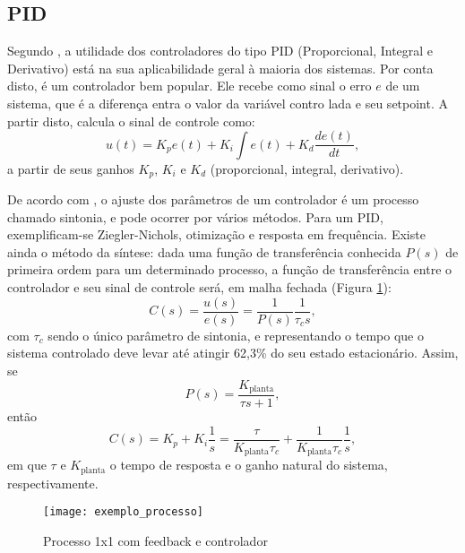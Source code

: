 \subsection{PID}

Segundo , a utilidade dos controladores do tipo PID (Proporcional, Integral e Derivativo) está na sua aplicabilidade geral à maioria dos sistemas. Por conta disto, é um controlador bem popular. Ele recebe como sinal o erro $e$ de um sistema, que é a diferença entra o valor da variável contro	lada e seu setpoint. A partir disto, calcula o sinal de controle como:
\begin{equation}
u(t) = K_p e(t) + K_i \int e(t) + K_d \frac{de(t)}{dt}
\label{eq_PID},	
\end{equation}
a partir de seus ganhos $K_p$, $K_i$ e $K_d$ (proporcional, integral, derivativo).

De acordo com , o ajuste dos parâmetros de um controlador é um processo chamado sintonia, e pode ocorrer por vários métodos. Para um PID, exemplificam-se Ziegler-Nichols, otimização e resposta em frequência. Existe ainda o método da síntese: dada uma função de transferência conhecida $P(s)$ de primeira ordem para um determinado processo, a função de transferência entre o controlador e seu sinal de controle será, em malha fechada (Figura \ref{img_exemplo_processo}):
\begin{equation}
C(s) = \frac{u(s)}{e(s)} = \frac{1}{P(s)} \frac{1}{\tau_c s},
\end{equation}
com $\tau_c$ sendo o único parâmetro de sintonia, e representando o tempo que o sistema controlado deve levar até atingir 62,3\% do seu estado estacionário. Assim, se 
\begin{equation}
P(s) = \frac{K_{\text{planta}}}{\tau s + 1},
\end{equation}
então
\begin{equation}
C(s) = K_p + K_i \frac{1}{s} = \frac{\tau}{K_{\text{planta}} \tau_c} + \frac{1}{K_{\text{planta}} \tau_c} \frac{1}{s},
\label{sintese_controlador}
\end{equation}
em que $\tau$ e $K_{\text{planta}}$ o tempo de resposta e o ganho natural do sistema, respectivamente.

\begin{figure}[hbt]
	\centering
	\caption{Processo 1x1 com feedback e controlador}
	\texttt{[image: exemplo\_processo]}
	\label{img_exemplo_processo}
\end{figure}


